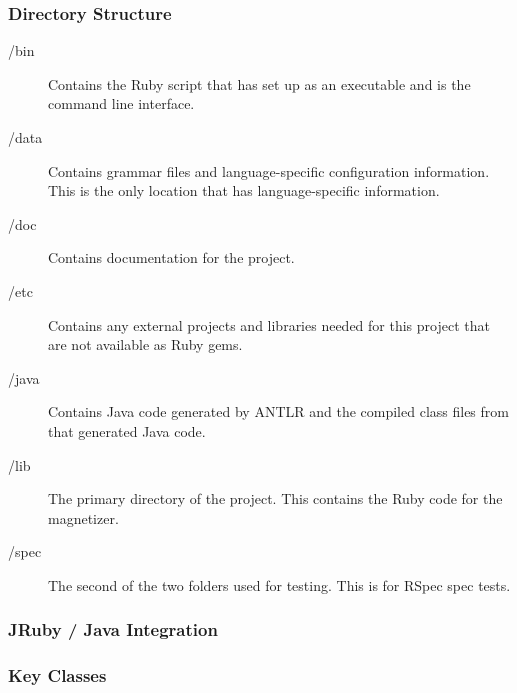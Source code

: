 \documentclass[letter,10pt]{article}
\begin{document}
\subsubsection{Directory Structure}
\begin{description}
 \item [/bin]
    Contains the Ruby script that has set up as an 
executable and is the command line interface.

 \item [/data]
    Contains grammar files and language-specific 
configuration information. This is the only location that has 
language-specific information.

 \item [/doc]
    Contains documentation for the project.
    
 \item [/etc]
    Contains any external projects and libraries needed for this 
project that are not available as Ruby gems.

 \item [/java]
    Contains Java code generated by ANTLR and the compiled class files 
from that generated Java code.

 \item [/lib]
    The primary directory of the project. This contains the Ruby code 
for the magnetizer.

 \item [/spec]
    The second of the two folders used for testing. This is for RSpec 
spec tests.

\end{description}


\subsubsection{JRuby / Java Integration}

\subsubsection{Key Classes}
\end{document}
